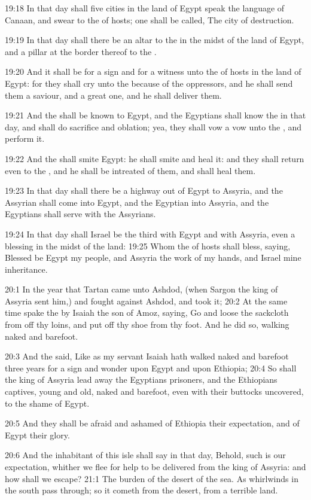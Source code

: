 19:18 In that day shall five cities in the land of Egypt speak the language of Canaan, and swear to the \LORD of hosts; one shall be called, The city of destruction.

19:19 In that day shall there be an altar to the \LORD in the midst of the land of Egypt, and a pillar at the border thereof to the \LORD.

19:20 And it shall be for a sign and for a witness unto the \LORD of hosts in the land of Egypt: for they shall cry unto the \LORD because of the oppressors, and he shall send them a saviour, and a great one, and he shall deliver them.

19:21 And the \LORD shall be known to Egypt, and the Egyptians shall know the \LORD in that day, and shall do sacrifice and oblation; yea, they shall vow a vow unto the \LORD, and perform it.

19:22 And the \LORD shall smite Egypt: he shall smite and heal it: and they shall return even to the \LORD, and he shall be intreated of them, and shall heal them.

19:23 In that day shall there be a highway out of Egypt to Assyria, and the Assyrian shall come into Egypt, and the Egyptian into Assyria, and the Egyptians shall serve with the Assyrians.

19:24 In that day shall Israel be the third with Egypt and with Assyria, even a blessing in the midst of the land: 19:25 Whom the \LORD of hosts shall bless, saying, Blessed be Egypt my people, and Assyria the work of my hands, and Israel mine inheritance.

20:1 In the year that Tartan came unto Ashdod, (when Sargon the king of Assyria sent him,) and fought against Ashdod, and took it; 20:2 At the same time spake the \LORD by Isaiah the son of Amoz, saying, Go and loose the sackcloth from off thy loins, and put off thy shoe from thy foot. And he did so, walking naked and barefoot.

20:3 And the \LORD said, Like as my servant Isaiah hath walked naked and barefoot three years for a sign and wonder upon Egypt and upon Ethiopia; 20:4 So shall the king of Assyria lead away the Egyptians prisoners, and the Ethiopians captives, young and old, naked and barefoot, even with their buttocks uncovered, to the shame of Egypt.

20:5 And they shall be afraid and ashamed of Ethiopia their expectation, and of Egypt their glory.

20:6 And the inhabitant of this isle shall say in that day, Behold, such is our expectation, whither we flee for help to be delivered from the king of Assyria: and how shall we escape?  21:1 The burden of the desert of the sea. As whirlwinds in the south pass through; so it cometh from the desert, from a terrible land.

